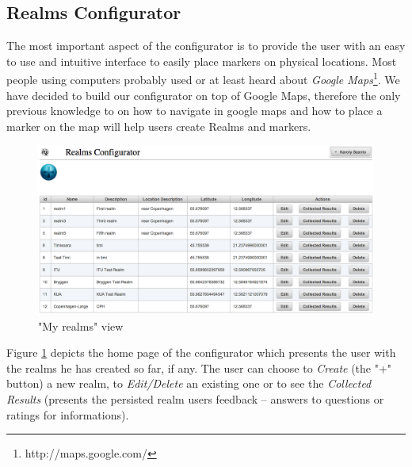 \subsection{Realms Configurator}
\noindent The most important aspect of the configurator is to provide the user with an easy to use and intuitive interface to easily place markers on physical locations. Most people using computers probably used or at least heard about \emph{Google Maps}\footnote{http://maps.google.com/}. We have decided to build our configurator on top of Google Maps, therefore the only previous knowledge to on how to navigate in google maps and how to place a marker on the map will help users create Realms and markers.\\
\begin{figure}[H] 
	\centering
	\includegraphics[width=\linewidth]{fig/my_realms.png}
	\caption{"My realms" view}
	\label{fig.my_realms}
\end{figure}

\noindent Figure \ref{fig.my_realms} depicts the home page of the configurator which presents the user with the realms he has created so far, if any. The user can choose to \emph{Create} (the "+" button) a new realm, to \emph{Edit/Delete} an existing one or to see the \emph{Collected Results} (presents the persisted realm users feedback -- answers to questions or ratings for informations).
\\

